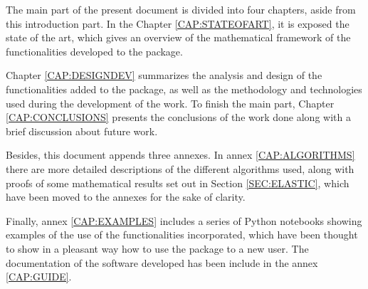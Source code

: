 The main part of the present document is divided into four chapters, aside from
this introduction part. In the Chapter \ref{CAP:STATEOFART}, it is exposed the
state of the art, which gives an overview of the mathematical framework of the
functionalities developed to the package.

Chapter \ref{CAP:DESIGNDEV} summarizes the analysis and design of the
functionalities added to the package, as well as the methodology and
technologies used during the development of the work. To finish the main part,
Chapter \ref{CAP:CONCLUSIONS} presents the conclusions of the work done along
with a brief discussion about future work.

Besides, this document appends three annexes. In annex \ref{CAP:ALGORITHMS} there are
more detailed descriptions of the different algorithms used, along with proofs of
some mathematical results set out
in Section \ref{SEC:ELASTIC}, which have been moved to the annexes for the
sake of clarity.

Finally, annex \ref{CAP:EXAMPLES} includes a series of Python notebooks showing
examples of the use of the functionalities incorporated, which have been thought
to show in a pleasant way how to use the package to a new user. The
documentation of the software developed has been include in the
annex \ref{CAP:GUIDE}.
